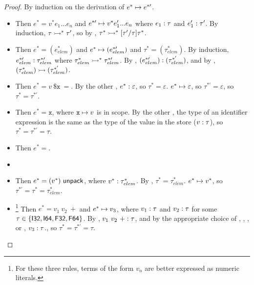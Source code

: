 \documentclass{article}
\begin{document}
\begin{proof}
By induction on the derivation of $e^* \mapsto e^{*\prime}$.
\begin{itemize}
    \item {}
        Then $e^* = v^* e_1 ... e_n$ and $e^{*\prime} \mapsto v^* e_1' ... e_n$ where $e_1 : \tau$ and $e_1' : \tau'$.
        By induction, $\tau \rightarrowtail^* \tau'$, so by , $\tau^* \rightarrowtail^* [\tau' / \tau]\tau^*$.
    
    \item {}
        Then $e^* = (e_{elem}^*)$ and $e^* \mapsto (e_{elem}^{*\prime})$ and $\tau^* = (\tau_{elem}^*)$.
        By induction, $e_{elem}^{*\prime} : \tau_{elem}^{*\prime}$ where $\tau_{elem}^* \rightarrowtail^* \tau_{elem}^{*\prime}$. By , $(e_{elem}^{*\prime}) : (\tau_{elem}^{*'})$, and by , $(\tau_{elem}^*) \rightarrowtail (\tau_{elem}^{*'})$.
        
    \item {}
        Then $e^* = v ~ \texttt{\$x} ~ =$. By the other , $e^* : \varepsilon$, so $\tau^* = \varepsilon$. $e^* \mapsto \varepsilon$, so $\tau^{*\prime} = \varepsilon$, so $\tau^* = \tau^{*\prime}$.

    \item {}
        Then $e^* = \texttt{x}$, where $\texttt{x} \mapsto v$ is in scope. By the other , the type of an identifier expression is the same as the type of the value in the store ($v : \tau$), so $\tau^* = \tau^{*\prime} = \tau$.
    
    \item {}
        Then $e^* = $.
    
    \item {}
    
    \item {}
        Then $e^* = (v^*) ~ \mathsf{unpack}$, where $v^* : \tau_{elem}^*$.
        By , $\tau^* = \tau_{elem}^*$. $e^* \mapsto v^*$, so $\tau^{*\prime} = \tau^* = \tau_{elem}^*$.
    
    \item {} \footnote{For these three rules, terms of the form $v_n$ are better expressed as numeric literals.}
        Then $e^* = v_1~ v_2~ +$ and $e^* \mapsto v_3$, where $v_1 : \tau$ and $v_2 : \tau$ for some $\tau \in \{\mathsf{I32}, \mathsf{I64}, \mathsf{F32}, \mathsf{F64}\}$.
        By , $v_1~ v_2~ + : \tau$, and by the appropriate choice of , , , or , $v_3 : \tau$., so $\tau^* = \tau^{*\prime} = \tau$.
    

\end{itemize}
\end{proof}
\end{document}
